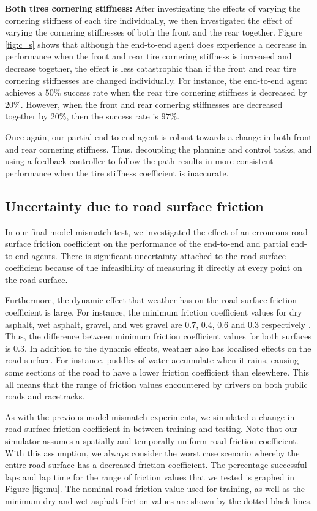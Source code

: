 \textbf{Both tires cornering stiffness:}
After investigating the effects of varying the cornering stiffness of each tire individually, we then investigated the effect of varying the cornering stiffnesses of both the front and the rear together.
Figure \ref{fig:c_s} shows that although the end-to-end agent does experience a decrease in performance when the front and rear tire cornering stiffness is increased and decrease together, the effect is less catastrophic than if the front and rear tire cornering stiffnesses are changed individually.
For instance, the end-to-end agent achieves a $50\%$ success rate when the rear tire cornering stiffness is decreased by $20\%$. 
However, when the front and rear cornering stiffnesses are decreased together by $20\%$, then the success rate is $97\%$.

Once again, our partial end-to-end agent is robust towards a change in both front and rear cornering stiffness.
Thus, decoupling the planning and control tasks, and using a feedback controller to follow the path results in more consistent performance when the tire stiffness coefficient is inaccurate.


\subsection{Uncertainty due to road surface friction}

In our final model-mismatch test, we investigated the effect of an erroneous road surface friction coefficient on the performance of the end-to-end and partial end-to-end agents.
There is significant uncertainty attached to the road surface coefficient because of the infeasibility of measuring it directly at every point on the road surface.

Furthermore, the dynamic effect that weather has on the road surface friction coefficient is large.
For instance, the minimum friction coefficient values for dry asphalt, wet asphalt, gravel, and wet gravel are $0.7$, $0.4$, $0.6$ and $0.3$ respectively \cite{Novikov2018}. 
Thus, the difference between minimum friction coefficient values for both surfaces is $0.3$.
In addition to the dynamic effects, weather also has localised effects on the road surface.
For instance, puddles of water accumulate when it rains, causing some sections of the road to have a lower friction coefficient than elsewhere.
This all means that the range of friction values encountered by drivers on both public roads and racetracks.

As with the previous model-mismatch experiments, we simulated a change in road surface friction coefficient in-between training and testing.
Note that our simulator assumes a spatially and temporally uniform road friction coefficient.
With this assumption, we always consider the worst case scenario whereby the entire road surface has a decreased friction coefficient.
The percentage successful laps and lap time for the range of friction values that we tested is graphed in Figure \ref{fig:mu}.
The nominal road friction value used for training, as well as the minimum dry and wet asphalt friction values are shown by the dotted black lines.

